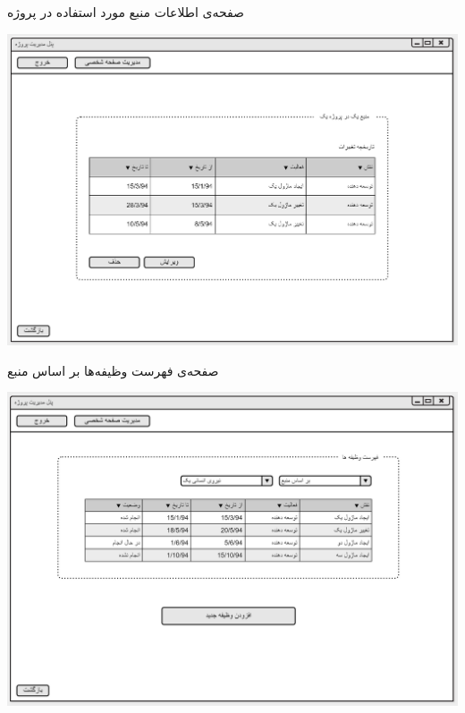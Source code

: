 \vspace{1cm}
صفحه‌ی اطلاعات منبع مورد استفاده در پروژه 
\begin{center}
\includegraphics[width=\textwidth]{Prototype/ProjectManager/ResourceInformation.png}
\end{center}

\newpage
\vspace{1cm}
صفحه‌ی فهرست وظیفه‌ها بر اساس منبع
\begin{center}
\includegraphics[width=\textwidth]{Prototype/ProjectManager/ProjectTasks1.png}
\end{center}


